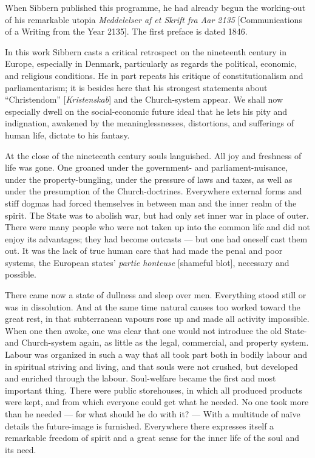 \documentclass[12pt,a4paper]{book}
\newcommand{\opage}[1]{\marginnote{\footnotesize\textit{[#1]}}}
\begin{document}
When Sibbern published this programme, he had already begun the working-out of his remarkable
utopia \emph{Meddelelser af et Skrift fra Aar 2135} [Communications of a Writing from the Year
2135]. The first preface is dated 1846.

\opage{115}In this work Sibbern casts a critical retrospect on the nineteenth century in Europe, especially in
Denmark, particularly as regards the political, economic, and religious conditions. He in part
repeats his critique of constitutionalism and parliamentarism; it is besides here that his
strongest statements about ``Christendom'' [\emph{Kristenskab}] and the Church-system appear. We
shall now especially dwell on the social-economic future ideal that he lets his pity and
indignation, awakened by the meaninglessnesses, distortions, and sufferings of human life, dictate
to his fantasy.

At the close of the nineteenth century souls languished. All joy and freshness of life was gone.
One groaned under the government- and parliament-nuisance, under the property-bungling, under the
pressure of laws and taxes, as well as under the presumption of the Church-doctrines. Everywhere
external forms and stiff dogmas had forced themselves in between man and the inner realm of the
spirit. The State was to abolish war, but had only set inner war in place of outer. There were many
people who were not taken up into the common life and did not enjoy its advantages; they had become
outcasts --- but one had oneself cast them out. It was the lack of true human care that had made
the penal and poor systems, the European states' \emph{partie honteuse} [shameful blot], necessary
and possible.

There came now a state of dullness and sleep over men. Everything stood still or was in dissolution.
And at the same time natural causes too worked toward the great rest, in that subterranean vapours
rose up and made all activity impossible. When one then awoke, one was clear that one would not
introduce the old State- and Church-system again, as little as the legal, commercial, and property
system. Labour was organized in such a way that all took part both in bodily labour and in
spiritual striving and living, and that souls were not crushed, but developed and enriched through
the labour. Soul-welfare became the first and most important thing. There were public storehouses,
in which all produced products were kept, and from which everyone could get what he needed. No one
took more than he needed --- for what should he do with it? --- \opage{116}With a multitude of naïve details
the future-image is furnished. Everywhere there expresses itself a remarkable freedom of spirit and
a great sense for the inner life of the soul and its need.
\end{document}
